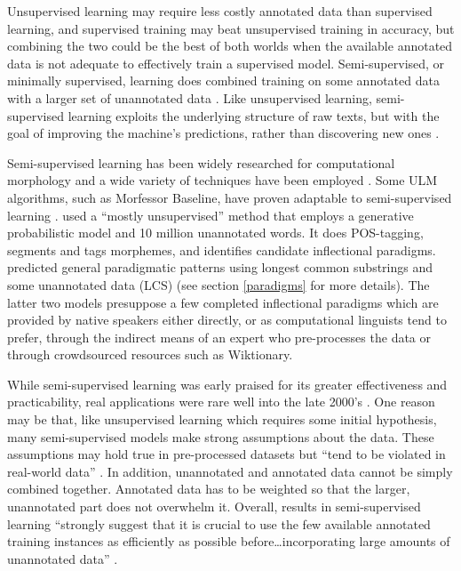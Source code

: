 \documentclass[12pt]{article}
\begin{document}
Unsupervised learning may require less costly annotated data than supervised learning, and supervised training may beat unsupervised training in accuracy, but combining the two could be the best of both worlds when the available annotated data is not adequate to effectively train a supervised model. Semi-supervised, or minimally supervised, learning does combined training on some annotated data with a larger set of unannotated data \cite{kohonen_semi-supervised_2010,poon_unsupervised_2009}. Like unsupervised learning, semi-supervised learning exploits the underlying structure of raw texts, but with the goal of improving the machine’s predictions, rather than discovering new ones \cite{settles_active_2010}. 

Semi-supervised learning has been widely researched for computational morphology and a wide variety of techniques have been employed \cite{ruokolainen_comparative_2016}. Some ULM algorithms, such as Morfessor Baseline, have proven adaptable to semi-supervised learning \cite{kohonen_semi-supervised_2010}.  used a ``mostly unsupervised'' method that employs a generative probabilistic model and 10 million unannotated words. It does POS-tagging, segments and tags morphemes, and identifies candidate inflectional paradigms.  predicted general paradigmatic patterns using longest common substrings and some unannotated data (LCS) (see section \ref{paradigms} for more details). The latter two models presuppose a few completed inflectional paradigms which are provided by native speakers either directly, or as computational linguists tend to prefer, through the indirect means of an expert who pre-processes the data or through crowdsourced resources such as Wiktionary.

While semi-supervised learning was early praised for its greater effectiveness and practicability, real applications were rare well into the late 2000’s \cite{druck_reducing_2007}. One reason may be that, like unsupervised learning which requires some initial hypothesis, many semi-supervised models make strong assumptions about the data. These assumptions may hold true in pre-processed datasets but ``tend to be violated in real-world data'' \cite[page 1]{druck_reducing_2007}. In addition, unannotated and annotated data cannot be simply combined together. Annotated data has to be weighted so that the larger, unannotated part does not overwhelm it. Overall, results in semi-supervised learning ``strongly suggest that it is crucial to use the few available annotated training instances as efficiently as possible before…incorporating large amounts of unannotated data'' \cite[page 35]{ruokolainen_supervised_2013}. 
\end{document}
